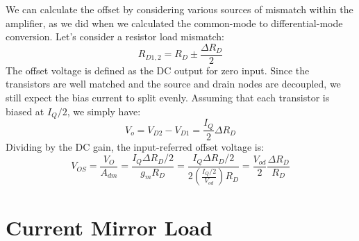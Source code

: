 We can calculate the offset by considering various sources of mismatch within the amplifier, as we did when we calculated the common-mode to differential-mode conversion.  Let's consider a resistor load mismatch:
\begin{equation} 
	{R_{D1,2}} = {R_D} \pm \frac{ \Delta {R_D}}{2} 
\end{equation}
The offset voltage is defined as the DC output for zero input.  Since the transistors are well matched and the source and drain nodes are decoupled, we still expect the bias current to split evenly.  Assuming that each transistor is biased at $I_Q/2$, we simply have:
\begin{equation}
	{V_o} = {V_{D2}} - {V_{D1}} = \frac{I_Q}{2}\Delta {R_D}
\end{equation}
Dividing by the DC gain, the input-referred offset voltage is:
\begin{equation}
	{V_{OS}} = \frac{{{V_O}}}{{{A_{dm}}}} = \frac{{I_Q\Delta {R_D}/2}}{{{g_m}{R_D}}} 
	  = \frac{{I_Q\Delta {R_D}/2}}{{2\left( {\frac{{I_Q/2}}{{{V_{od}}}}} \right){R_D}}} 
	  = \frac{{{V_{od}}}}{2}\frac{{\Delta {R_D}}}{{{R_D}}}
\end{equation}
\section{Current Mirror Load}
